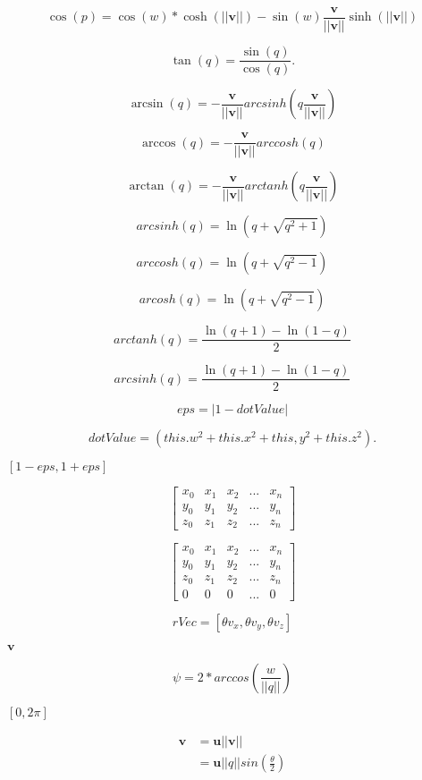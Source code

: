 \documentclass{article}
\begin{document}
\[\cos(p) = \cos(w) * \cosh(||\boldsymbol{v}||) - \sin(w)\frac{\boldsymbol{v}}{||\boldsymbol{v}||}\sinh(||\boldsymbol{v}||)\]
\pagebreak

\[\tan(q) = \frac{\sin(q)}{\cos(q)}.\]
\pagebreak

\[\arcsin(q) = -\frac{\boldsymbol{v}}{||\boldsymbol{v}||}arcsinh(q\frac{\boldsymbol{v}}{||\boldsymbol{v}||})\]
\pagebreak

\[\arccos(q) = -\frac{\boldsymbol{v}}{||\boldsymbol{v}||}arccosh(q)\]
\pagebreak

\[\arctan(q) = -\frac{\boldsymbol{v}}{||\boldsymbol{v}||}arctanh(q\frac{\boldsymbol{v}}{||\boldsymbol{v}||})\]
\pagebreak

\[arcsinh(q) = \ln(q + \sqrt{q^2 + 1})\]
\pagebreak

\[arccosh(q) = \ln(q + \sqrt{q^2 - 1})\]
\pagebreak

\[arcosh(q) = \ln(q + \sqrt{q^2 - 1})\]
\pagebreak

\[arctanh(q) = \frac{\ln(q + 1) - \ln(1 - q)}{2}\]
\pagebreak

\[arcsinh(q) = \frac{\ln(q + 1) - \ln(1 - q)}{2}\]
\pagebreak

\[eps = |1 - dotValue|\]
\pagebreak

\[dotValue = (this.w^2 + this.x^2 + this,y^2 + this.z^2).\]
\pagebreak

$[1-eps, 1+eps]$
\pagebreak

\[\begin{bmatrix} x_0& x_1& x_2&...&x_n\\ y_0& y_1& y_2&...&y_n\\ z_0& z_1& z_2&...&z_n \end{bmatrix}\]
\pagebreak

\[\begin{bmatrix} x_0& x_1& x_2&...&x_n\\ y_0& y_1& y_2&...&y_n\\ z_0& z_1& z_2&...&z_n\\ 0&0&0&...&0 \end{bmatrix}\]
\pagebreak

\[ rVec = [\theta v_x, \theta v_y, \theta v_z]\]
\pagebreak

$\boldsymbol{v}$
\pagebreak

\[\psi = 2 *arccos(\frac{w}{||q||})\]
\pagebreak

$[0, 2\pi]$
\pagebreak

\[\begin{equation} \begin{split} \boldsymbol{v} &= \boldsymbol{u} ||\boldsymbol{v}||\\ &= \boldsymbol{u}||q||sin(\frac{\theta}{2}) \end{split} \end{equation}\]
\pagebreak
\end{document}
